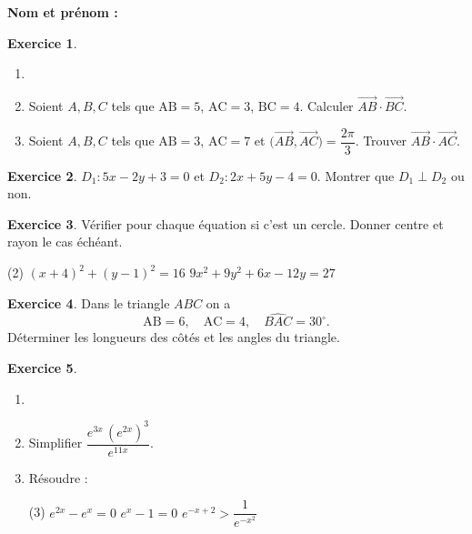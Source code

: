 \documentclass{article}
\theoremstyle{definition}
\newtheorem{exercice}{Exercice}
\begin{document}
\pagestyle{fancy}

\fancyhf{} %
\fancyhead[L]{\large \textbf{\Niveau}}
\fancyhead[C]{\large \textbf{\Chapitre}}

\Large

\textbf{Nom et prénom :}\enspace\dotfill

\begin{exercice}
  \begin{enumerate}
    \item[]
    \item Soient $A,B,C$ tels que $\mathrm{AB}=5$, $\mathrm{AC}=3$, $\mathrm{BC}=4$. Calculer 
    $\overrightarrow{AB}\cdot\overrightarrow{BC}$.
    \item Soient $A,B,C$ tels que $\mathrm{AB}=3$, $\mathrm{AC}=7$ et 
    $\bigl(\overrightarrow{AB},\overrightarrow{AC}\bigr)=\dfrac{2\pi}{3}$. 
    Trouver $\overrightarrow{AB}\cdot\overrightarrow{AC}$.
  \end{enumerate}
\end{exercice}

\vfill

\begin{exercice}
  $D_1:5x-2y+3=0$ et $D_2:2x+5y-4=0$.  
  Montrer que $D_1\perp D_2$ ou non.
\end{exercice}

\vfill

\begin{exercice}
  Vérifier pour chaque équation si c’est un cercle. Donner centre et rayon le cas échéant.
  \begin{tasks}(2)
    \task $(x+4)^2+(y-1)^2=16$
    \task $9x^2+9y^2+6x-12y=27$
  \end{tasks}
\end{exercice}

\vfill

\begin{exercice}
  Dans le triangle $ABC$ on a
  $$\mathrm{AB}=6,\quad\mathrm{AC}=4,\quad\widehat{BAC}=30^\circ.$$
  Déterminer les longueurs des côtés et les angles du triangle.
\end{exercice}

\vfill

\begin{exercice}
  \begin{enumerate}
    \item[]
    \item Simplifier $\dfrac{e^{3x}\,(e^{2x})^3}{e^{11x}}$.
    \item Résoudre :
    \begin{tasks}(3)
      \task $e^{2x}-e^x=0$
      \task $e^x-1=0$
      \task $e^{-x+2}>\dfrac1{e^{-x^2}}$
    \end{tasks}
  \end{enumerate}
\end{exercice}
\end{document}
